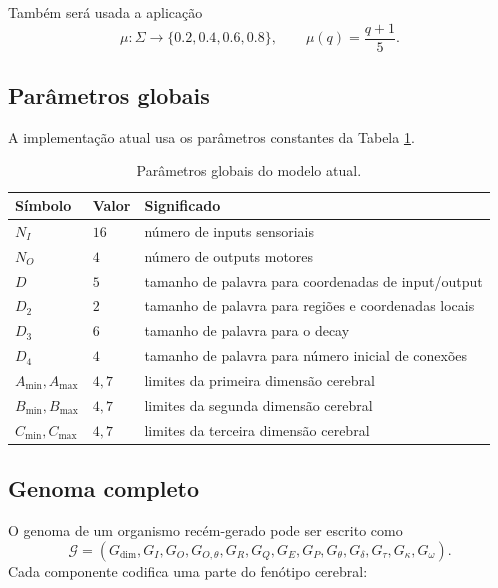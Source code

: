 \documentclass[12pt,a4paper,fleqn]{article}
\newcommand{\SigmaGen}{\Sigma}
\begin{document}
Também será usada a aplicação
$$
	\mu:\SigmaGen\to\{0.2,0.4,0.6,0.8\},\qquad
	\mu(q)=\frac{q+1}{5}.
$$

\subsection{Parâmetros globais}

A implementação atual usa os parâmetros constantes da Tabela \ref{tab:parametros}.

\begin{table}[H]
\centering
\caption{Parâmetros globais do modelo atual.}
\label{tab:parametros}
\begin{tabular}{lll}
\toprule
Símbolo & Valor & Significado \\
\midrule
$N_I$ & $16$ & número de inputs sensoriais \\
$N_O$ & $4$ & número de outputs motores \\
$D$ & $5$ & tamanho de palavra para coordenadas de input/output \\
$D_2$ & $2$ & tamanho de palavra para regiões e coordenadas locais \\
$D_3$ & $6$ & tamanho de palavra para o decay \\
$D_4$ & $4$ & tamanho de palavra para número inicial de conexões \\
$A_{\min},A_{\max}$ & $4,7$ & limites da primeira dimensão cerebral \\
$B_{\min},B_{\max}$ & $4,7$ & limites da segunda dimensão cerebral \\
$C_{\min},C_{\max}$ & $4,7$ & limites da terceira dimensão cerebral \\
\bottomrule
\end{tabular}
\end{table}

\subsection{Genoma completo}

O genoma de um organismo recém-gerado pode ser escrito como
$$
	\mathcal{G}=
	(G_{\dim},
	G_I,
	G_O,
	G_{O,\theta},
	G_R,
	G_Q,
	G_E,
	G_P,
	G_\theta,
	G_\delta,
	G_\tau,
	G_\kappa,
	G_\omega).
$$
Cada componente codifica uma parte do fenótipo cerebral:
\end{document}
